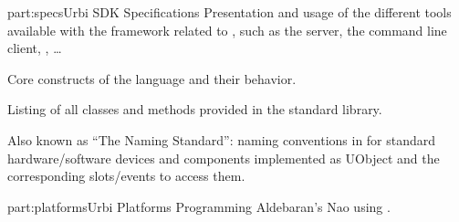 \begin{partDescription}{part:specs}{Urbi SDK Specifications}
%
  Presentation and usage of the different tools available with the
  \urbi framework related to \us, such as the \urbi server, the
  command line client, \umake, \ldots

%
  Core constructs of the language and their behavior.

%
  Listing of all classes and methods provided in the standard library.

%
  Also known as ``The \urbi Naming Standard'': naming conventions in
  for standard hardware/software devices and components implemented as
  UObject and the corresponding slots/events to access them.

\end{partDescription}

\begin{partDescription}{part:platforms}{Urbi Platforms}
%
  Programming Aldebaran's Nao using \urbi.
\end{partDescription}




